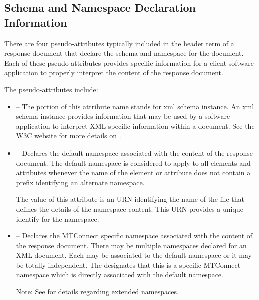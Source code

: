 \pagebreak

\subsection{Schema and Namespace Declaration Information}
\label{appendix:Schema and Namespace Declaration Information}

There are four pseudo-attributes typically included in the \gls{header term} of a \gls{response document} that declare the \gls{schema} and \gls{namespace} for the document.  Each of these pseudo-attributes provides specific information for a client software application to properly interpret the content of the \gls{response document}.

The pseudo-attributes include:

\begin{itemize}

\item {} – The  portion of this attribute name stands for \gls{xml schema} instance.  An \gls{xml schema} instance provides information that may be used by a software application to interpret XML specific information within a document.  See the W3C website for more details on .

\item {} – Declares the default \gls{namespace} associated with the content of the \gls{response document}.  The default \gls{namespace} is considered to apply to all elements and attributes whenever the name of the element or attribute does not contain a prefix identifying an alternate \gls{namespace}.

The value of this attribute is an URN identifying the name of the file that defines the details of the \gls{namespace} content.  This URN provides a unique identify for the \gls{namespace}.

\item {} – Declares the MTConnect specific \gls{namespace} associated with the content of the \gls{response document}.  There may be multiple \glspl{namespace} declared for an XML document.  Each may be associated to the default \gls{namespace} or it may be totally independent.  The  designates that this is a specific MTConnect \gls{namespace} which is directly associated with the default \gls{namespace}.

\begin{note} 
Note:	See  for details regarding extended \glspl{namespace}.
\end{note}


\end{itemize}
